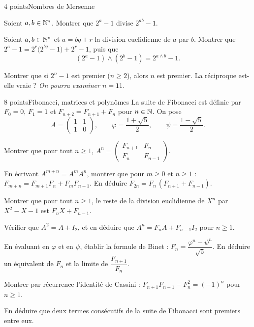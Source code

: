 \begin{exoEval}{4 points}{Nombres de Mersenne}
\begin{questions}
  \item Soient $a,b\in\mathbb{N}^{*}$. Montrer que $2^{a}-1$ divise $2^{ab}-1$.
  \item Soient $a,b\in\mathbb{N}^{*}$ et $a=bq+r$ la division euclidienne de $a$
    par $b$. Montrer que $2^{a}-1=2^{r}\bigl(2^{bq}-1\bigr)+2^{r}-1$, puis que
    \[(2^{a}-1)\wedge(2^{b}-1)=2^{a\wedge b}-1.\]
  \item Montrer que si $2^{n}-1$ est premier ($n\geqslant2$), alors $n$ est
    premier. La réciproque est-elle vraie ? \emph{On pourra examiner
    $n=11$.}
\end{questions}
\end{exoEval}

\begin{exoEval}[Problème]{8 points}{Fibonacci, matrices et polynômes}
La suite de Fibonacci est définie par $F_0=0$, $F_1=1$ et
$F_{n+2}=F_{n+1}+F_n$ pour $n\in\mathbb{N}$. On pose
\[A=\begin{pmatrix}1&1\\1&0\end{pmatrix},\qquad
  \varphi=\frac{1+\sqrt5}{2},\qquad\psi=\frac{1-\sqrt5}{2}.\]
\begin{questions}
  \item Montrer que pour tout $n\geqslant1$,
    $A^{n}=\begin{pmatrix}F_{n+1}&F_n\\F_n&F_{n-1}\end{pmatrix}$.
  \item En écrivant $A^{m+n}=A^{m}A^{n}$, montrer que pour $m\geqslant0$ et
    $n\geqslant1$ : $F_{m+n}=F_{m+1}F_n+F_mF_{n-1}$. En déduire
    $F_{2n}=F_n\,(F_{n+1}+F_{n-1})$.
\end{questions}
\begin{questions}[start=3]
  \item Montrer que pour tout $n\geqslant1$, le reste de la division
    euclidienne de $X^{n}$ par $X^{2}-X-1$ est $F_nX+F_{n-1}$.
  \item Vérifier que $A^{2}=A+I_2$, et en déduire que
    $A^{n}=F_nA+F_{n-1}I_2$ pour $n\geqslant1$.
  \item En évaluant en $\varphi$ et en $\psi$, établir la formule de Binet :
    $F_n=\dfrac{\varphi^{n}-\psi^{n}}{\sqrt5}$. En déduire un équivalent de
    $F_n$ et la limite de $\dfrac{F_{n+1}}{F_n}$.
\end{questions}
\begin{questions}[start=6]
  \item Montrer par récurrence l'identité de Cassini :
    $F_{n+1}F_{n-1}-F_n^{2}=(-1)^{n}$ pour $n\geqslant1$.
  \item En déduire que deux termes consécutifs de la suite de Fibonacci sont
    premiers entre eux.
\end{questions}
\end{exoEval}
